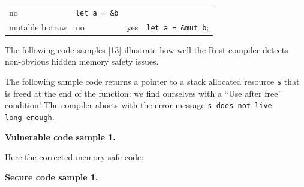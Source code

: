 \begin{longtable}[]{@{}llll@{}}
\begin{minipage}[t]{0.16\columnwidth}
no\strut
\end{minipage} & \begin{minipage}[t]{0.26\columnwidth}\raggedright\strut
\texttt{let\ a\ =\ \&b}\strut
\end{minipage}\tabularnewline
\begin{minipage}[t]{0.31\columnwidth}\raggedright\strut
mutable borrow\strut
\end{minipage} & \begin{minipage}[t]{0.16\columnwidth}\raggedright\strut
no\strut
\end{minipage} & \begin{minipage}[t]{0.16\columnwidth}\raggedright\strut
yes\strut
\end{minipage} & \begin{minipage}[t]{0.26\columnwidth}\raggedright\strut
\texttt{let\ a\ =\ \&mut\ b};\strut
\end{minipage}\tabularnewline
\bottomrule
\end{longtable}

The following code samples
{[}\protect\hyperlink{rustonomicon2016}{13}{]} illustrate how well the
Rust compiler detects non-obvious hidden memory safety issues.

The following sample code returns a pointer to a stack allocated
resource \texttt{s} that is freed at the end of the function: we find
ourselves with a ``Use after free'' condition! The compiler aborts with
the error message \texttt{s\ does\ not\ live
long\ enough}.

\textbf{Vulnerable code sample 1.}

\begin{Shaded}
\begin{Highlighting}[]
 \NormalTok{) -> &} \NormalTok{\{}
       \NormalTok{(}
\NormalTok{\}}
\end{Highlighting}
\end{Shaded}

Here the corrected memory safe code:

\textbf{Secure code sample 1.}

\begin{Shaded}
\begin{Highlighting}[]
 \NormalTok{) -> } \NormalTok{\{}
       \NormalTok{(}
\NormalTok{\}}
\end{Highlighting}
\end{Shaded}

